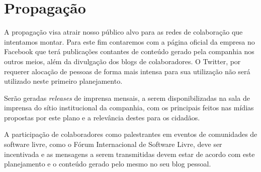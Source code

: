 \chapter{Propagação}

A propagação visa atrair nosso público alvo para as redes de colaboração que intentamos montar. Para este fim contaremos com a página oficial da empresa no Facebook que terá publicações contantes de conteúdo gerado pela companhia nos outros meios, além da divulgação dos blogs de colaboradores. O Twitter, por requerer alocação de pessoas de forma mais intensa para sua utilização não será utilizado neste primeiro planejamento.

Serão geradas \emph{releases} de imprensa mensais, a serem disponibilizadas na sala de imprensa do sítio institucional da companhia, com os principais feitos nas mídias propostas por este plano e a relevância destes para os cidadãos.

A participação de colaboradores como palestrantes em eventos de comunidades de software livre, como o Fórum Internacional de Software Livre, deve ser incentivada e as mensagens a serem transmitidas devem estar de acordo com este planejamento e o conteúdo gerado pelo mesmo no seu blog pessoal.
